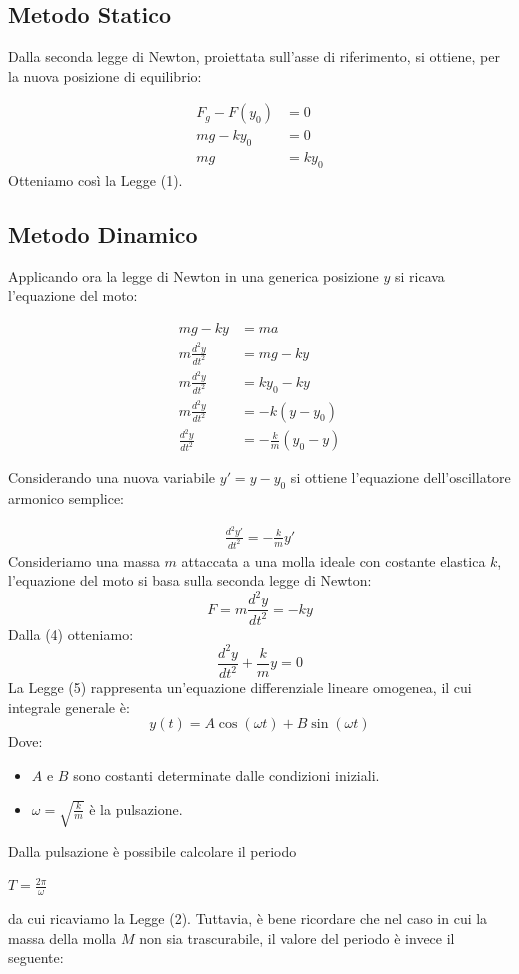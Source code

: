 \documentclass[11pt]{article}
\begin{document}
\subsection{Metodo Statico}
Dalla seconda legge di Newton, proiettata sull'asse di riferimento, si ottiene, per la nuova posizione di equilibrio:

\begin{align}
    F_g - F(y_0) &= 0 \\
    mg - ky_0 &= 0 \\
    mg &= ky_0
\end{align}
Otteniamo così la Legge (1).

\subsection{Metodo Dinamico}
Applicando ora la legge di Newton in una generica posizione $y$ si ricava l'equazione del moto:

\begin{align}
    mg - ky &= ma \\
    m\frac{d^2y}{dt^2}  &= mg - ky \\
    m\frac{d^2y}{dt^2}  &= ky_0 - ky \\
    m\frac{d^2y}{dt^2}  &= -k(y - y_0) \\
    \frac{d^2y}{dt^2}  &= -\frac{k}{m}(y_0 - y)
\end{align}

Considerando una nuova variabile $y' = y - y_0$ si ottiene l'equazione dell'oscillatore armonico semplice:   

\begin{align}
    \frac{d^2y'}{dt^2} = -\frac{k}{m}y'
\end{align}
Consideriamo una massa $m$ attaccata a una molla ideale con costante elastica $k$, l'equazione del moto si basa sulla seconda legge di Newton:
\begin{equation}
    F = m\frac{d^2y}{dt^2} = -ky
\end{equation}
Dalla (4) otteniamo:
\begin{equation}
    \frac{d^2y}{dt^2} + \frac{k}{m}y = 0
\end{equation}
La Legge (5) rappresenta un'equazione differenziale lineare omogenea, il cui integrale generale è:
\begin{equation}
    y(t) = A\cos(\omega t)+B\sin(\omega t)
\end{equation}
Dove:
\begin{itemize}
    \item $A$ e $B$ sono costanti determinate dalle condizioni iniziali.
    \item $\omega = \sqrt{\frac{k}{m}}$ è la pulsazione.
\end{itemize}
Dalla pulsazione è possibile calcolare il periodo 
\begin{center}
    $T=\frac{2\pi}{\omega}$
\end{center}
da cui ricaviamo la Legge (2).
Tuttavia, è bene ricordare che nel caso in cui la massa della molla $M$ non sia trascurabile, il valore del periodo è invece il seguente: 
\end{document}
